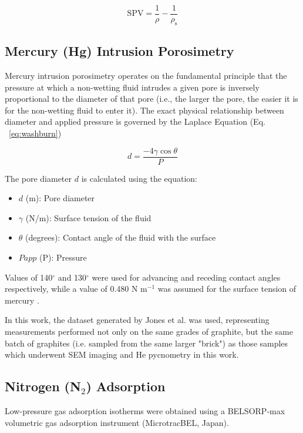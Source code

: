 \documentclass[3p,twocolumn]{elsarticle}
\begin{document}
\begin{equation}
\mathrm{SPV} = \frac{1}{\rho}-\frac{1}{\rho_\mathrm{s}}\label{eq:SPV} 
\end{equation}

\subsection{Mercury (Hg) Intrusion Porosimetry}
Mercury intrusion porosimetry operates on the fundamental principle that the
pressure at which a non-wetting fluid intrudes a given pore is inversely
proportional to the diameter of that pore (i.e., the larger the pore, the easier
it is for the non-wetting fluid to enter it). The exact physical relationship
between diameter and applied pressure is governed by the Laplace Equation (Eq.
~\ref{eq:washburn})
	
	\begin{equation} \label{eq:washburn}
		d = \frac{-4\gamma \cos \theta}{P}
	\end{equation}

		The pore diameter \(d\) is calculated using the equation:
	\begin{itemize}
		\item $d$ (m): Pore diameter
		\item $\gamma$ (N/m): Surface tension of the fluid
		\item $\theta$ (degrees): Contact angle of the fluid with the surface
		\item $Papp$ (P): Pressure
	\end{itemize}

Values of 140$^{\circ}$ and 130$^{\circ}$ were used for advancing and receding
contact angles respectively, while a value of 0.480 N m$^{-1}$ was assumed for the
surface tension of mercury \citep{VANBRAKEL19811}. 

In this work, the dataset generated by Jones et al. \citep{Jones2018} was used,
representing measurements performed not only on the same grades of graphite, but
the same batch of graphites (i.e. sampled from the same larger "brick") as those samples
which underwent SEM imaging and He pycnometry in this work.

\subsection{Nitrogen (N$_2$) Adsorption}
Low-pressure gas adsorption isotherms were obtained using a BELSORP-max
volumetric gas adsorption instrument (MicrotracBEL, Japan). 
\end{document}
